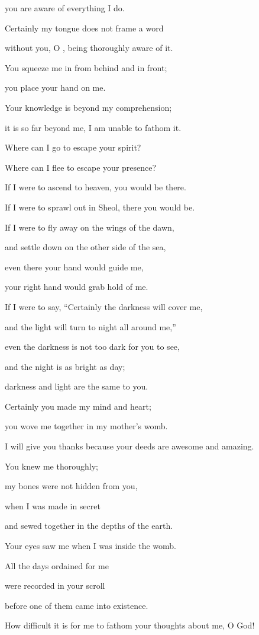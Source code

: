 {\par }{\Q you are aware
of everything I do.
\par }{\Q {}Certainly
my tongue
does not
frame
a word
\par }{\Q without you, O
{}, being thoroughly aware of it.
\par }{\Q {}You squeeze
me in from
behind
and in front;
\par }{\Q you place
your hand
on me.
\par }{\Q {}Your knowledge
is beyond
my comprehension;
\par }{\Q it is so far beyond me,
I am unable
to fathom it.
\par }{\Q {}Where
can I go
to escape your spirit?
\par }{\Q Where
can I flee to escape
your presence?
\par }{\Q {}If
I were to ascend
to heaven,
you would be there.
\par }{\Q If
I were to sprawl out
in Sheol,
there you would be.
\par }{\Q {}If I were to fly
away on the wings
of the dawn,
\par }{\Q and settle
down on the other side
of the sea,
\par }{\Q {}even
there
your hand
would guide
me,
\par }{\Q your right hand
would grab hold of me.
\par }{\Q {}If I were to say,
“Certainly
the darkness
will cover
me,

\par }{\Q and the light
will turn
to night all around me,”
\par }{\Q {}even
the darkness
is not
too dark
for you to see,

\par }{\Q and the night
is as bright as
day;
\par }{\Q darkness
and light are the same to you.
\par }{\Q {}Certainly
you
made
my mind
and heart;
\par }{\Q you wove
me together in my mother’s
womb.
\par }{\Q {}I will give you thanks
because
your deeds
are awesome
and amazing.
\par }{\Q You knew
me thoroughly;
\par }{\Q {}my bones were not
hidden
from
you,
\par }{\Q when I was made
in secret
\par }{\Q and sewed
together in the depths
of the earth.
\par }{\Q {}Your eyes
saw
me when I was inside the womb.
\par }{\Q All
the days
ordained
for me
\par }{\Q were recorded
in your scroll
\par }{\Q before one of them came into existence.
\par }{\Q {}How
difficult it is for me to fathom
your thoughts
about me, O God!

}
